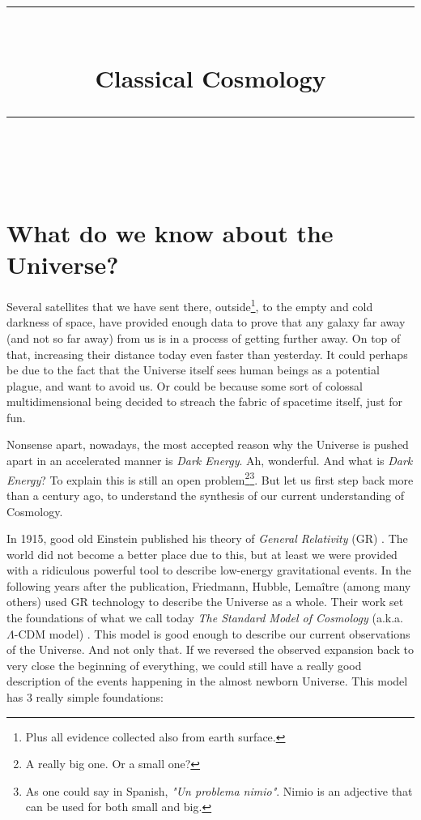 \documentclass[11pt, a4paper]{article} %
\title{	
	\normalfont\normalsize
	\textsc{}\\ %
	\vspace{5pt} %
	\rule{\linewidth}{0.2pt}\\ %
	\vspace{10pt} %
	{\huge Classical Cosmology}\\ %
	\vspace{5pt} %
	\rule{\linewidth}{-2pt}\\ %
	\vspace{-25pt} %
	\date{}
}
\author{}
\begin{document}
\maketitle 



\section*{What do we know about the Universe?}

Several satellites that we have sent there, outside\footnote{Plus all evidence collected also from earth surface.}, to the empty and cold darkness of space, have provided enough data to prove that any galaxy far away (and not so far away) from us is in a process of getting further away. On top of that, increasing their distance today even faster than yesterday. It could perhaps be due to the fact that the Universe itself sees human beings as a potential plague, and want to avoid us. Or could be because some sort of colossal multidimensional being decided to streach the fabric of spacetime itself, just for fun.

Nonsense apart, nowadays, the most accepted reason why the Universe is pushed apart in an accelerated manner is \textit{Dark Energy}. Ah, wonderful. And what is \textit{Dark Energy}? To explain this is still an open problem\footnote{A really big one. Or a small one?}\footnote{As one could say in Spanish, \textit{"Un problema nimio"}. Nimio is an adjective that can be used for both small and big.}. But let us first step back more than a century ago, to understand the synthesis of our current understanding of Cosmology.


In 1915, good old Einstein published his theory of \textit{General Relativity} (GR) \cite{einstein1915feldgleichungen}. The world did not become a better place due to this, but at least we were provided with a ridiculous powerful tool to describe low-energy gravitational events. In the following years after the publication, Friedmann, Hubble, Lema\^itre \cite{} (among many others) used GR technology to describe the Universe as a whole. Their work set the foundations of what we call today \textit{The Standard Model of Cosmology} (a.k.a. $\Lambda$-CDM model) \cite{}. This model is good enough to describe our current observations of the Universe. And not only that. If we reversed the observed expansion back to very close the beginning of everything, we could still have a really good description of the events happening in the almost newborn Universe. This model has 3 really simple foundations:
\end{document}
